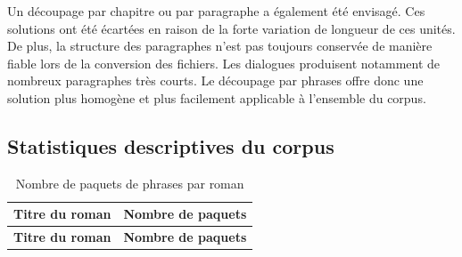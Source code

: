 Un découpage par chapitre ou par paragraphe a également été envisagé. Ces solutions ont été écartées en raison de la forte variation de longueur de ces unités. De plus, la structure des paragraphes n'est pas toujours conservée de manière fiable lors de la conversion des fichiers. Les dialogues produisent notamment de nombreux paragraphes très courts. Le découpage par phrases offre donc une solution plus homogène et plus facilement applicable à l'ensemble du corpus.

\subsection{Statistiques descriptives du corpus}

\begin{longtable}{p{8cm}r}
\caption{Nombre de paquets de phrases par roman} \\
\toprule
\textbf{Titre du roman} & \textbf{Nombre de paquets} \\
\midrule
\endfirsthead

\toprule
\textbf{Titre du roman} & \textbf{Nombre de paquets} \\
\midrule
\endhead


\end{longtable}
